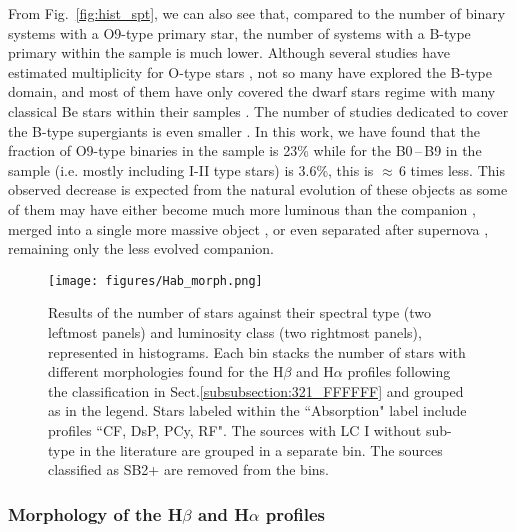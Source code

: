 \documentclass{aa}
\begin{document}
From Fig.~\ref{fig:hist_spt}, we can also see that, compared to the number of binary systems with a O9-type primary star, the number of systems with a B-type primary within the sample is much lower. Although several studies have estimated multiplicity for O-type stars \citep[e.g.][among some others]{2010RMxAC..38...30B,2013A&A...550A.107S}, not so many have explored the B-type domain, and most of them have only covered the dwarf stars regime with many classical Be stars within their samples \citep[e.g.][]{2006A&A...456..623E,2021A&A...652A..70B,2022A&A...658A..69B}. The number of studies dedicated to cover the B-type supergiants is even smaller \citep[][]{2015A&A...580A..93D,2015A&A...575A..70M}. In this work, we have found that the fraction of O9-type binaries in the sample is 23\% while for the B0\,--\,B9 in the sample (i.e. mostly including I-II type stars) is 3.6\%, this is $\approx$\,6 times less. This observed decrease is expected from the natural evolution of these objects as some of them may have either become much more luminous than the companion \citep[by evolution or mass transfer,][]{2012ARA&A..50..107L,2013ApJ...764..166D}, merged into a single more massive object \citep[e.g.][]{1992ApJ...391..246P,2013A&A...552A.105V}, or even separated after supernova \citep[e.g.][]{2011BSRSL..80..543D,2014ApJ...782....7D}, remaining only the less evolved companion. 


\begin{figure*}[!t]
\centering
\texttt{[image: figures/Hab\_morph.png]}
\caption{Results of the number of stars against their spectral type (two leftmost panels) and luminosity class (two rightmost panels), represented in histograms. Each bin stacks the number of stars with different morphologies found for the H$\beta$ and H$\alpha$ profiles following the classification in Sect.\ref{subsubsection:321_FFFFFF} and grouped as in the legend. Stars labeled within the ``Absorption" label include profiles ``CF, DsP, PCy, RF". The sources with LC I without sub-type in the literature are grouped in a separate bin. The sources classified as SB2+ are removed from the bins.}
\label{fig:hab_morph}
\end{figure*}

\subsubsection{\texorpdfstring{Morphology of the H$\beta$ and H$\alpha$ profiles}{Morphology of the Hb and Ha profiles}}
\label{subsubsection:425_YYYYY}
\end{document}
